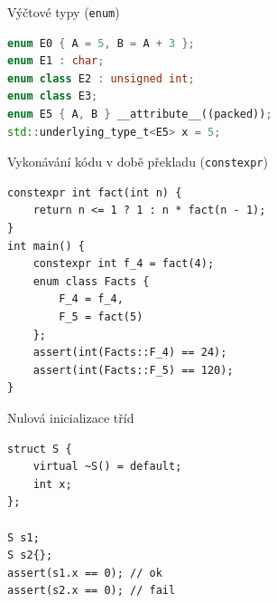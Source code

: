 \documentclass[11pt]{beamer}
\begin{document}


\begin{frame}[fragile]{Výčtové typy (\texttt{enum})}
\begin{lstlisting}[language=C++]
enum E0 { A = 5, B = A + 3 };
enum E1 : char;
enum class E2 : unsigned int;
enum class E3;
enum E5 { A, B } __attribute__((packed));
std::underlying_type_t<E5> x = 5;
\end{lstlisting}
\end{frame}




\begin{frame}[fragile]{Vykonávání kódu v době překladu (\texttt{constexpr})}
\begin{lstlisting}
constexpr int fact(int n) {
	return n <= 1 ? 1 : n * fact(n - 1);
}
int main() {
	constexpr int f_4 = fact(4);
	enum class Facts {
		F_4 = f_4,
		F_5 = fact(5)
	};
	assert(int(Facts::F_4) == 24);
	assert(int(Facts::F_5) == 120);
}
\end{lstlisting}
\end{frame}



\begin{frame}[fragile]{Nulová inicializace tříd}
\begin{lstlisting}
struct S {
	virtual ~S() = default;
	int x;
};

S s1;
S s2{};
assert(s1.x == 0); // ok
assert(s2.x == 0); // fail
\end{lstlisting}
\end{frame}
\end{document}
